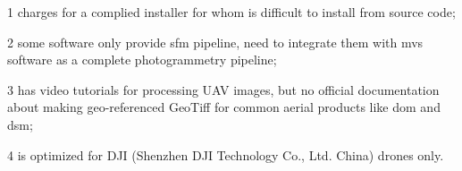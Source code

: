 \begin{table}[htb]
\begin{center}
\begin{threeparttable}
\begin{tablenotes}
        \item[1] charges for a complied installer for whom is difficult to install from source code;
        \item[2] some software only provide \gls{sfm} pipeline, need to integrate them with \gls{mvs} software as a complete photogrammetry pipeline;
        \item[3] has video tutorials for processing UAV images, but no official documentation about making geo-referenced GeoTiff for common aerial products like \gls{dom} and \gls{dsm};
        \item[4] is optimized for DJI (Shenzhen DJI Technology Co., Ltd. China) drones only.
      \end{tablenotes}
      \end{threeparttable}
    \end{center}
\end{table}